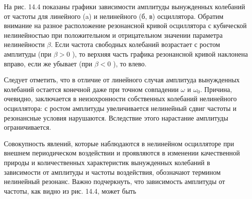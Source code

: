 \documentclass[10pt]{article}
\begin{document}
На рис. 14.4 показаны графики зависимости амплитуды вынужденных колебаний от частоты для линейного (a) и нелинейного (б, в) осциллятора. Обратим внимание на разное расположение резонансной кривой осциллятора с кубической нелинейностью при положительном и отрицательном значении параметра нелинейности $\beta$. Если частота свободных колебаний возрастает с ростом амплитуды (при $\beta>0$ ), то верхняя часть графика резонансной кривой наклонена вправо, если же убывает (при $\beta<0$ ), то влево.

Следует отметить, что в отличие от линейного случая амплитуда вынужденных колебаний остается конечной даже при точном совпадении $\omega$ и $\omega_{0}$. Причина, очевидно, заключается в неизохронности собственных колебаний нелинейного осциллятора: с ростом амплитуды увеличивается нелинейный сдвиг частоты и резонансные условия нарушаются. Вследствие этого нарастание амплитуды ограничивается.

Совокупность явлений, которые наблюдаются в нелинейном осцилляторе при внешнем периодическом воздействии и проявляются в изменении качественной природы и количественных характеристик вынужденных колебаний в зависимости от амплитуды и частоты воздействия, обозначают термином нелинейный резонанс. Важно подчеркнуть, что зависимость амплитуды от частоты, как видно из рис. 14.4, может быть
\end{document}
